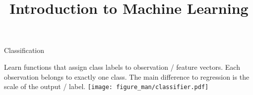 \documentclass[11pt,compress,t,notes=noshow, xcolor=table]{beamer}
\title{Introduction to Machine Learning}
\begin{document}


%
\begin{vbframe}{Classification}
%
%
%

Learn functions that assign class labels to observation / feature vectors. Each observation belongs to exactly one class. The main difference to regression is the scale of the output / label.
{\centering \texttt{[image: figure\_man/classifier.pdf]}}

\end{vbframe}
\end{document}
